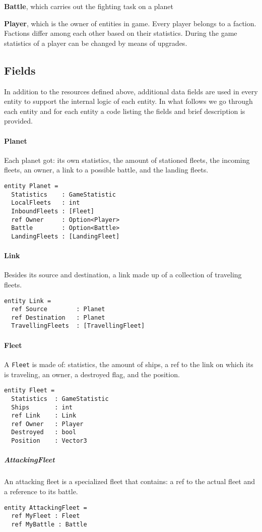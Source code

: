 \noindent
\newline
\textbf{Battle}, which carries out the fighting task on a planet 

\noindent
\newline
\textbf{Player}, which is the owner of entities in game. Every player belongs to a faction. Factions differ among each other based on their statistics. During the game statistics of a player can be changed by means of upgrades.


\subsection{Fields}
In addition to the resources defined above, additional data fields are used in every entity to support the internal logic of each entity. In what follows we go through each entity and for each entity a code listing the fields and brief description is provided.

\paragraph{Planet}
Each planet got: its own statistics, the amount of stationed fleets, the incoming fleets, an owner, a link to a possible battle, and the landing fleets.
\begin{lstlisting}
entity Planet =
  Statistics    : GameStatistic
  LocalFleets   : int
  InboundFleets : [Fleet]
  ref Owner     : Option<Player>
  Battle        : Option<Battle>
  LandingFleets : [LandingFleet] 
\end{lstlisting}
\paragraph{Link}
Besides its source and destination, a link made up of a collection of traveling fleets.
\begin{lstlisting}
entity Link =
  ref Source        : Planet
  ref Destination   : Planet
  TravellingFleets  : [TravellingFleet]
\end{lstlisting}
\paragraph{Fleet}
A \texttt{Fleet} is made of: statistics, the amount of ships, a ref to the link on which its is traveling, an owner, a destroyed flag, and the position.
\begin{lstlisting}
entity Fleet =
  Statistics  : GameStatistic
  Ships       : int
  ref Link    : Link
  ref Owner   : Player
  Destroyed   : bool
  Position    : Vector3
\end{lstlisting}
\subparagraph{AttackingFleet}
An attacking fleet is a specialized fleet that contains: a ref to the actual fleet and a reference to its battle.
\begin{lstlisting}
entity AttackingFleet =
  ref MyFleet : Fleet
  ref MyBattle : Battle
\end{lstlisting}

